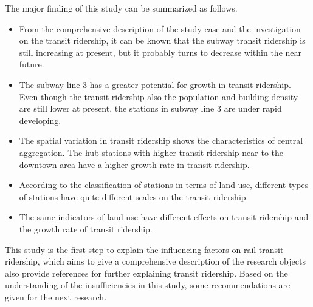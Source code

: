 %
The major finding of this study can be summarized as follows. 

%
\begin{itemize}
	\item From the comprehensive description of the study case and the investigation on the transit ridership, it can be known that the subway transit ridership is still increasing at present, but it probably turns to decrease within the near future. 
	
	\item The subway line 3 has a greater potential for growth in transit ridership. Even though the transit ridership also the population and building density are still lower at present, the stations in subway line 3 are under rapid developing.
	
	\item The spatial variation in transit ridership shows the characteristics of central aggregation. The hub stations with higher transit ridership near to the downtown area have a higher growth rate in transit ridership.
	
	\item According to the classification of stations in terms of land use, different types of stations have quite different scales on the transit ridership.
	
	\item The same indicators of land use have different effects on transit ridership and the growth rate of transit ridership.
\end{itemize}

%
This study is the first step to explain the influencing factors on rail transit ridership, which aims to give a comprehensive description of the research objects also provide references for further explaining transit ridership. Based on the understanding of the insufficiencies in this study, some recommendations are given for the next research.

